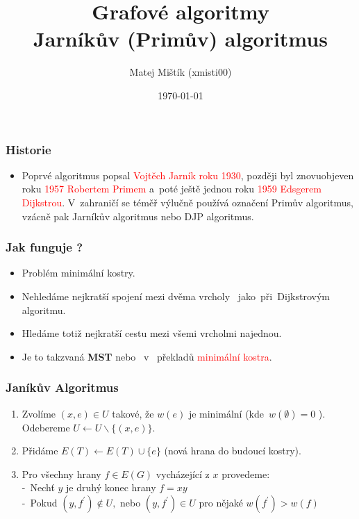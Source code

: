 \documentclass[12pt, hyperref={unicode}]{beamer}
\title{Grafové algoritmy \\ Jarníkův (Primův) algoritmus}
\author{Matej Mištík (xmisti00)}
\institute{Vysoké učení technické v Brně \\  Fakulta informačních technologii}
\date{\today}
\begin{document}
\begin{frame}
	\titlepage
\end{frame}

\begin{frame}
	\frametitle{Historie}
	\begin{itemize}
		\item  Poprvé algoritmus popsal \textcolor{red}{Vojtěch Jarník roku 1930}, později byl znovuobjeven roku \textcolor{red}{1957 Robertem Primem} a~poté ještě jednou roku \textcolor{red}{1959 Edsgerem Dijkstrou}. V~zahraničí se téměř výlučně používá označení Primův algoritmus, vzácně pak Jarníkův algoritmus nebo DJP algoritmus.
	\end{itemize}	
\end{frame}

\begin{frame}
	\frametitle{Jak funguje ?}
	\begin{itemize}
		\item Problém minimální kostry. 	
		\pause		
		\item Nehledáme nejkratší spojení mezi dvěma vrcholy
	    ~jako~při~Dijkstrovým algoritmu.
		\pause
		\item Hledáme totiž nejkratší cestu mezi všemi vrcholmi najednou.
		\item Je to takzvaná \textbf{MST}  nebo ~v~ překladů \textcolor{red}{minimální kostra}.
	\end{itemize}
		
\end{frame}



\begin{frame}
	\frametitle{Janíkův Algoritmus}
	\begin{enumerate}	
		\item Zvolíme $(x, e) \in U$ takové, že $w(e)$ je minimální          (kde~$w(\emptyset)=0$ ). \\
		 Odebereme $U \leftarrow U \backslash\{(x, e)\}$.
			\pause
		\item Přidáme $E(T) \leftarrow E(T) \cup\{e\}$ (nová hrana do budoucí kostry).
			\pause
		\item Pro všechny hrany $f \in E(G)$ vycházející z $x$ provedeme:\\
		    -~Nechť $y$ je druhý konec hrany $f=x y$
		    \\
		    -~Pokud $\left(y, f^{\prime}\right) \notin U,$ nebo $\left(y, f^{\prime}\right) \in U$ pro nějaké $w\left(f^{\prime}\right)>w(f)$
	\end{enumerate}	
		
\end{frame}
\end{document}
